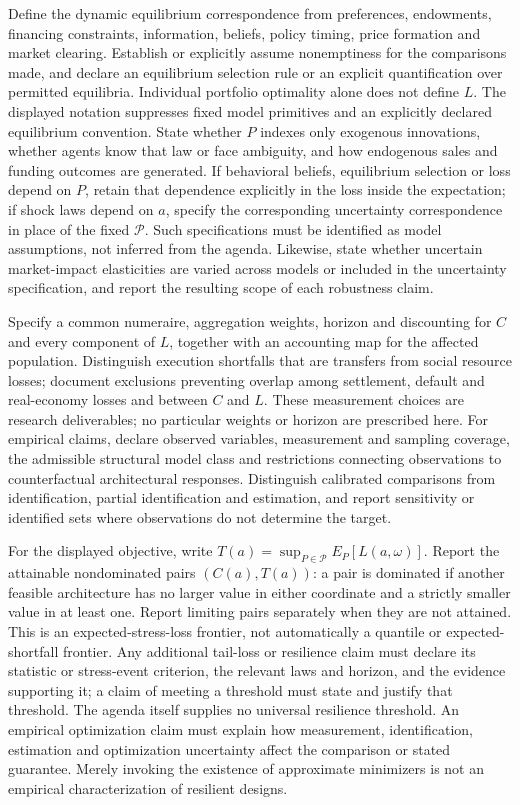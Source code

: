 \documentclass[11pt,a4paper]{article}
\begin{document}
Define the dynamic equilibrium correspondence from preferences, endowments, financing constraints, information, beliefs, policy timing, price formation and market clearing. Establish or explicitly assume nonemptiness for the comparisons made, and declare an equilibrium selection rule or an explicit quantification over permitted equilibria. Individual portfolio optimality alone does not define \(L\). The displayed notation suppresses fixed model primitives and an explicitly declared equilibrium convention. State whether \(P\) indexes only exogenous innovations, whether agents know that law or face ambiguity, and how endogenous sales and funding outcomes are generated. If behavioral beliefs, equilibrium selection or loss depend on \(P\), retain that dependence explicitly in the loss inside the expectation; if shock laws depend on \(a\), specify the corresponding uncertainty correspondence in place of the fixed \(\mathcal P\). Such specifications must be identified as model assumptions, not inferred from the agenda. Likewise, state whether uncertain market-impact elasticities are varied across models or included in the uncertainty specification, and report the resulting scope of each robustness claim.

Specify a common numeraire, aggregation weights, horizon and discounting for \(C\) and every component of \(L\), together with an accounting map for the affected population. Distinguish execution shortfalls that are transfers from social resource losses; document exclusions preventing overlap among settlement, default and real-economy losses and between \(C\) and \(L\). These measurement choices are research deliverables; no particular weights or horizon are prescribed here. For empirical claims, declare observed variables, measurement and sampling coverage, the admissible structural model class and restrictions connecting observations to counterfactual architectural responses. Distinguish calibrated comparisons from identification, partial identification and estimation, and report sensitivity or identified sets where observations do not determine the target.

For the displayed objective, write \(T(a)=\sup_{P\in\mathcal P}E_P[L(a,\omega)]\). Report the attainable nondominated pairs \((C(a),T(a))\): a pair is dominated if another feasible architecture has no larger value in either coordinate and a strictly smaller value in at least one. Report limiting pairs separately when they are not attained. This is an expected-stress-loss frontier, not automatically a quantile or expected-shortfall frontier. Any additional tail-loss or resilience claim must declare its statistic or stress-event criterion, the relevant laws and horizon, and the evidence supporting it; a claim of meeting a threshold must state and justify that threshold. The agenda itself supplies no universal resilience threshold. An empirical optimization claim must explain how measurement, identification, estimation and optimization uncertainty affect the comparison or stated guarantee. Merely invoking the existence of approximate minimizers is not an empirical characterization of resilient designs.
\end{document}
